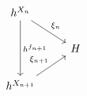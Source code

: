 \documentclass[12pt]{standalone}
\begin{document}
        $$

\begin{tikzcd}
h^{X_n} \ar[dd,"h^{f_{n+1}}"] \ar[dr,"\xi_n"] & \\
& H \\
h^{X_{n+1}} \ar[ru,"\xi_{n+1}"] &  
\end{tikzcd}
        $$
        
\end{document}
